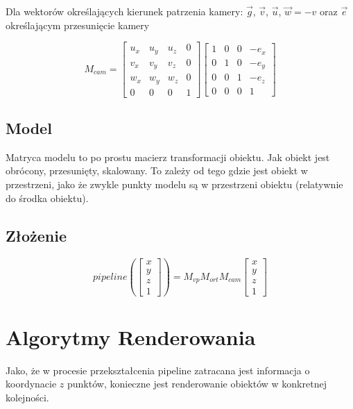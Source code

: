 \documentclass{../notatki}
\begin{document}
Dla wektorów określających kierunek patrzenia kamery: $\vec{g}$, $\vec{v}$, $\vec{u}$, $\vec{w} = -v$ oraz $\vec{e}$ określającym przesunięcie kamery

$$
M_{cam} = \begin{bmatrix} 
    u_x & u_y & u_z & 0 \\
    v_x & v_y & v_z & 0 \\
    w_x & w_y & w_z & 0 \\
    0 & 0 & 0 & 1 
\end{bmatrix}
\begin{bmatrix}
    1 & 0 & 0 & -e_x \\
    0 & 1 & 0 & -e_y \\
    0 & 0 & 1 & -e_z \\
    0 & 0 & 0 & 1 
\end{bmatrix}
$$

\subsection{Model}

Matryca modelu to po prostu macierz transformacji obiektu.
Jak obiekt jest obrócony, przesunięty, skalowany.
To zależy od tego gdzie jest obiekt w przestrzeni, jako że zwykle punkty modelu są w przestrzeni obiektu (relatywnie do środka obiektu).

\subsection{Złożenie}

$$
pipeline(\begin{bmatrix}x \\ y \\ z\\ 1\end{bmatrix}) = M_{vp}M_{ort}M_{cam}\begin{bmatrix}x \\ y \\ z\\ 1\end{bmatrix}
$$

\section{Algorytmy Renderowania}

Jako, że w procesie przekształcenia pipeline zatracana jest informacja o koordynacie $z$ punktów, konieczne jest renderowanie obiektów w konkretnej kolejności.
\end{document}

